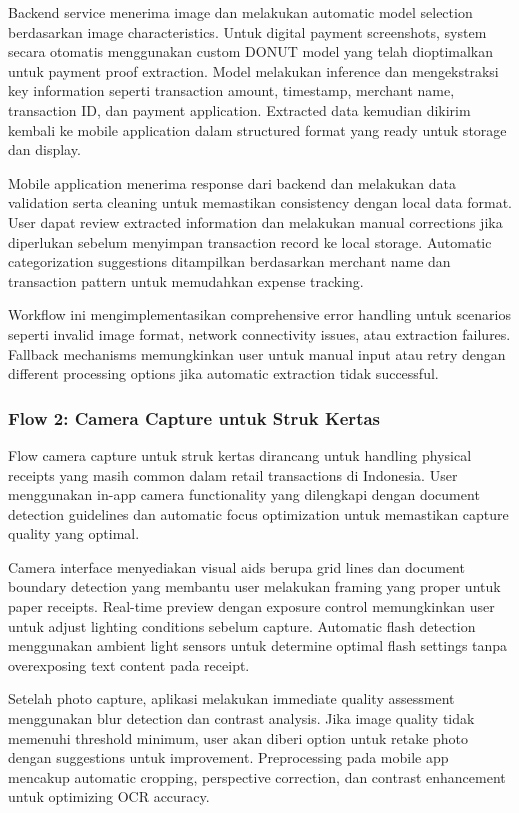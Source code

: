 Backend service menerima image dan melakukan automatic model selection berdasarkan image characteristics. Untuk digital payment screenshots, system secara otomatis menggunakan custom DONUT model yang telah dioptimalkan untuk payment proof extraction. Model melakukan inference dan mengekstraksi key information seperti transaction amount, timestamp, merchant name, transaction ID, dan payment application. Extracted data kemudian dikirim kembali ke mobile application dalam structured format yang ready untuk storage dan display.

Mobile application menerima response dari backend dan melakukan data validation serta cleaning untuk memastikan consistency dengan local data format. User dapat review extracted information dan melakukan manual corrections jika diperlukan sebelum menyimpan transaction record ke local storage. Automatic categorization suggestions ditampilkan berdasarkan merchant name dan transaction pattern untuk memudahkan expense tracking.

Workflow ini mengimplementasikan comprehensive error handling untuk scenarios seperti invalid image format, network connectivity issues, atau extraction failures. Fallback mechanisms memungkinkan user untuk manual input atau retry dengan different processing options jika automatic extraction tidak successful.

\subsubsection{Flow 2: Camera Capture untuk Struk Kertas}
\label{subsubsec:flow-camera-receipt}

Flow camera capture untuk struk kertas dirancang untuk handling physical receipts yang masih common dalam retail transactions di Indonesia. User menggunakan in-app camera functionality yang dilengkapi dengan document detection guidelines dan automatic focus optimization untuk memastikan capture quality yang optimal.

Camera interface menyediakan visual aids berupa grid lines dan document boundary detection yang membantu user melakukan framing yang proper untuk paper receipts. Real-time preview dengan exposure control memungkinkan user untuk adjust lighting conditions sebelum capture. Automatic flash detection menggunakan ambient light sensors untuk determine optimal flash settings tanpa overexposing text content pada receipt.

Setelah photo capture, aplikasi melakukan immediate quality assessment menggunakan blur detection dan contrast analysis. Jika image quality tidak memenuhi threshold minimum, user akan diberi option untuk retake photo dengan suggestions untuk improvement. Preprocessing pada mobile app mencakup automatic cropping, perspective correction, dan contrast enhancement untuk optimizing OCR accuracy.

